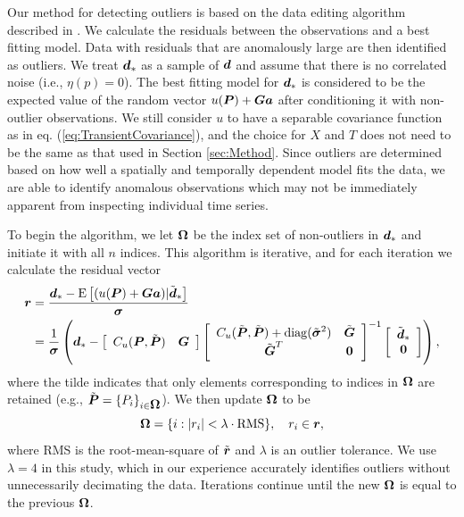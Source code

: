 \documentclass[extra,mreferee]{gji}
\begin{document}
Our method for detecting outliers is based on the data editing algorithm described in \citet{Gibbs2011}. We calculate the residuals between the observations and a best fitting model. Data with residuals that are anomalously large are then identified as outliers. We treat $\mitbf{d}_*$ as a sample of $\mitbf{d}$ and assume that there is no correlated noise (i.e., $\eta(p) = 0$).  The best fitting model for $\mitbf{d}_*$ is considered to be the expected value of the random vector $u(\mitbf{P}) + \mitbf{G}\mitbf{a}$ after conditioning it with non-outlier observations.  We still consider $u$ to have a separable covariance function as in eq. (\ref{eq:TransientCovariance}), and the choice for $X$ and $T$ does not need to be the same as that used in Section \ref{sec:Method}. Since outliers are determined based on how well a spatially and temporally dependent model fits the data, we are able to identify anomalous observations which may not be immediately apparent from inspecting individual time series. 

To begin the algorithm, we let $\mitbf{\Omega}$ be the index set of non-outliers in $\mitbf{d}_*$ and initiate it with all $n$ indices. This algorithm is iterative, and for each iteration we calculate the residual vector
\begin{align}\label{eq:Residual}
\mitbf{r} &= \frac{\mitbf{d}_* - \mathrm{E}\left[(u(\mitbf{P}) + \mitbf{G}\mitbf{a})|\tilde{\mitbf{d}}_* \right]}{\mitbf{\sigma}} \\
       &= \frac{1}{\mitbf{\sigma}}\left(\mitbf{d}_*  - 
          \left[\begin{array}{cc}
                C_u(\mitbf{P},\tilde{\mitbf{P}}) & \mitbf{G} \\
                \end{array}\right]
          \left[\begin{array}{cc}
                C_u(\tilde{\mitbf{P}},\tilde{\mitbf{P}}) + \mathrm{diag}(\tilde{\mitbf{\sigma}}^2) & \tilde{\mitbf{G}} \\
                \tilde{\mitbf{G}}^T  & \mitbf{0} \\
                \end{array}\right]^{-1}
          \left[\begin{array}{c}
                \tilde{\mitbf{d}}_* \\
                \mitbf{0} \\
                \end{array}\right]\right),
\end{align}
where the tilde indicates that only elements corresponding to indices in $\mitbf{\Omega}$ are retained (e.g., $\tilde{\mitbf{P}} = \{P_i\}_{i\in\mitbf{\Omega}}$). We then update $\mitbf{\Omega}$ to be
\begin{equation}\label{eq:Update}
\mitbf{\Omega} = \{i : |r_i| < \lambda \cdot \mathrm{RMS}\}, \ \ \ r_i \in \mitbf{r},
\end{equation} 
where RMS is the root-mean-square of $\tilde{\mitbf{r}}$ and $\lambda$ is an outlier tolerance. We use $\lambda=4$ in this study, which in our experience accurately identifies outliers without unnecessarily decimating the data. Iterations continue until the new $\mitbf{\Omega}$ is equal to the previous $\mitbf{\Omega}$. 
\end{document}
